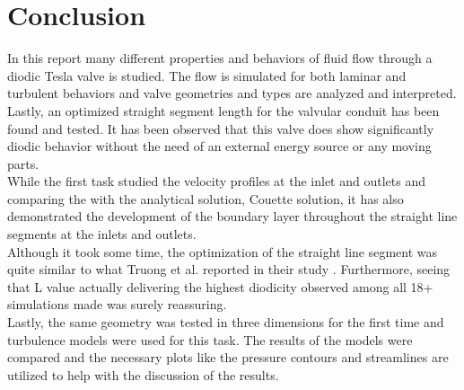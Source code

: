 \section{Conclusion}

In this report many different properties and behaviors of fluid flow through a diodic Tesla valve is 
studied. The flow is simulated for both laminar and turbulent behaviors and valve geometries and types are analyzed and interpreted. Lastly, an optimized straight segment length for the valvular conduit has 
been found and tested. It has been observed that this valve does show significantly diodic behavior without the need of an external energy source or any moving parts. \\ 

While the first task studied the velocity profiles at the inlet and outlets and comparing the with the analytical solution, Couette solution, it has also demonstrated the development of the boundary layer throughout the straight line segments at the inlets and outlets. \\


Although it took some time, the optimization of the straight line segment was quite similar to what Truong et al. reported in their study \cite{truong}. Furthermore, seeing that L value actually delivering the highest diodicity observed among all 18+ simulations made was surely reassuring. \\

Lastly, the same geometry was tested in three dimensions for the first time and turbulence models were used for this task. The results of the models were compared and the necessary plots like the pressure contours and streamlines are utilized to help with the discussion of the results.

